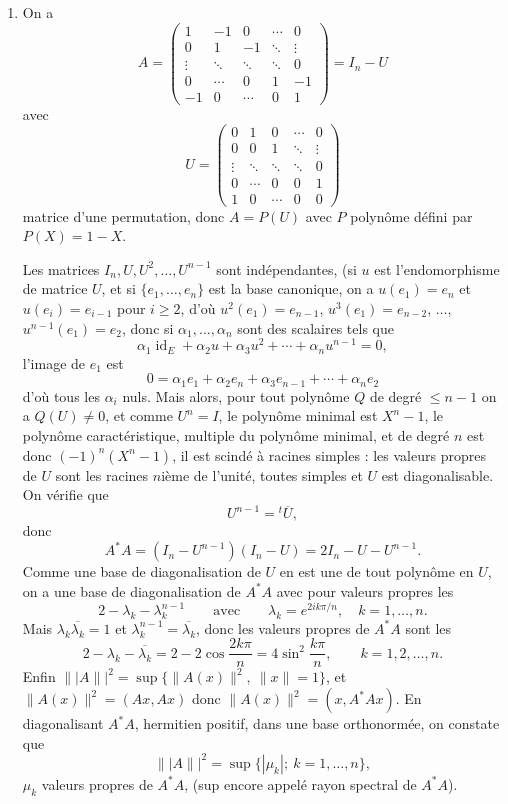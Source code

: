 \begin{enumerate}[label=\arabic*.,leftmargin=2.2em,itemsep=1.15em]
\item On a
\[
A=\begin{pmatrix}
1&-1&0&\cdots&0\\
0&1&-1&\ddots&\vdots\\
\vdots&\ddots&\ddots&\ddots&0\\
0&\cdots&0&1&-1\\
-1&0&\cdots&0&1
\end{pmatrix}=I_n-U
\]
avec
\[
U=\begin{pmatrix}
0&1&0&\cdots&0\\
0&0&1&\ddots&\vdots\\
\vdots&\ddots&\ddots&\ddots&0\\
0&\cdots&0&0&1\\
1&0&\cdots&0&0
\end{pmatrix}
\]
matrice d'une permutation, donc $A=P(U)$ avec $P$ polynôme défini par $P(X)=1-X$.

Les matrices $I_n,U,U^2,\ldots,U^{n-1}$ sont indépendantes, (si $u$ est l'endomorphisme de matrice $U$, et si $\{e_1,\ldots,e_n\}$ est la base canonique, on a $u(e_1)=e_n$ et $u(e_i)=e_{i-1}$ pour $i\ge2$, d'où $u^2(e_1)=e_{n-1}$, $u^3(e_1)=e_{n-2}$, $\ldots$, $u^{n-1}(e_1)=e_2$, donc si $\alpha_1,\ldots,\alpha_n$ sont des scalaires tels que
\[
\alpha_1\operatorname{id}_E+\alpha_2u+\alpha_3u^2+\cdots+\alpha_nu^{n-1}=0,
\]
l'image de $e_1$ est
\[
0=\alpha_1e_1+\alpha_2e_n+\alpha_3e_{n-1}+\cdots+\alpha_ne_2
\]
d'où tous les $\alpha_i$ nuls. Mais alors, pour tout polynôme $Q$ de degré $\le n-1$ on a $Q(U)\ne0$, et comme $U^n=I$, le polynôme minimal est $X^n-1$, le polynôme caractéristique, multiple du polynôme minimal, et de degré $n$ est donc $(-1)^n(X^n-1)$, il est scindé à racines simples : les valeurs propres de $U$ sont les racines $n$ième de l'unité, toutes simples et $U$ est diagonalisable. On vérifie que
\[
U^{n-1}={}^t\!\overline U,
\]
donc
\[
A^*A=(I_n-U^{n-1})(I_n-U)=2I_n-U-U^{n-1}.
\]
Comme une base de diagonalisation de $U$ en est une de tout polynôme en $U$, on a une base de diagonalisation de $A^*A$ avec pour valeurs propres les
\[
2-\lambda_k-\lambda_k^{n-1}
\qquad\text{avec}\qquad
\lambda_k=e^{2ik\pi/n},\quad k=1,\ldots,n.
\]
Mais $\lambda_k\overline{\lambda_k}=1$ et $\lambda_k^{n-1}=\overline{\lambda_k}$, donc les valeurs propres de $A^*A$ sont les
\[
2-\lambda_k-\overline{\lambda_k}=2-2\cos\frac{2k\pi}{n}=4\sin^2\frac{k\pi}{n},
\qquad k=1,2,\ldots,n.
\]
Enfin $\|\!|A\|\!|^2=\sup\{\|A(x)\|^2,\ \|x\|=1\}$, et $\|A(x)\|^2=(Ax,Ax)$ donc $\|A(x)\|^2=(x,A^*Ax)$. En diagonalisant $A^*A$, hermitien positif, dans une base orthonormée, on constate que
\[
\|\!|A\|\!|^2=\sup\{|\mu_k|;\ k=1,\ldots,n\},
\]
$\mu_k$ valeurs propres de $A^*A$, (sup encore appelé rayon spectral de $A^*A$).


\end{enumerate}
